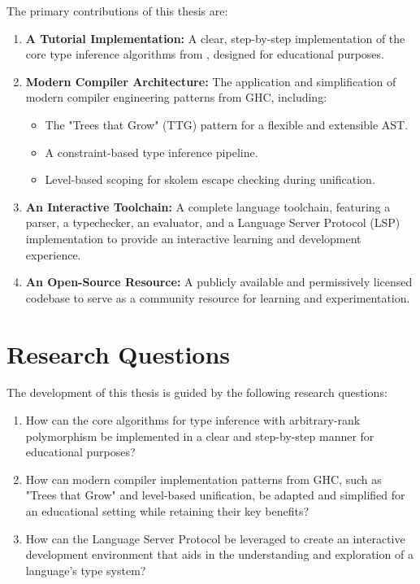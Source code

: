 The primary contributions of this thesis are:
\begin{enumerate}
    \item \textbf{A Tutorial Implementation:} A clear, step-by-step implementation of the core type inference algorithms from \cite{jones-practical-2007}, designed for educational purposes.
    \item \textbf{Modern Compiler Architecture:} The application and simplification of modern compiler engineering patterns from GHC, including:
          \begin{itemize}
              \item The "Trees that Grow" (TTG) pattern for a flexible and extensible AST.
              \item A constraint-based type inference pipeline.
              \item Level-based scoping for skolem escape checking during unification.
          \end{itemize}
    \item \textbf{An Interactive Toolchain:} A complete language toolchain, featuring a parser, a typechecker, an evaluator, and a Language Server Protocol (LSP) implementation to provide an interactive learning and development experience.
    \item \textbf{An Open-Source Resource:} A publicly available and permissively licensed codebase \cite{deemp-arbitrary-rank-tutorial} to serve as a community resource for learning and experimentation.
\end{enumerate}

\section{Research Questions}

The development of this thesis is guided by the following research questions:
\begin{enumerate}
    \item How can the core algorithms for type inference with arbitrary-rank polymorphism be implemented in a clear and step-by-step manner for educational purposes?
    \item How can modern compiler implementation patterns from GHC, such as "Trees that Grow" and level-based unification, be adapted and simplified for an educational setting while retaining their key benefits?
    \item How can the Language Server Protocol be leveraged to create an interactive development environment that aids in the understanding and exploration of a language's type system?
\end{enumerate}

